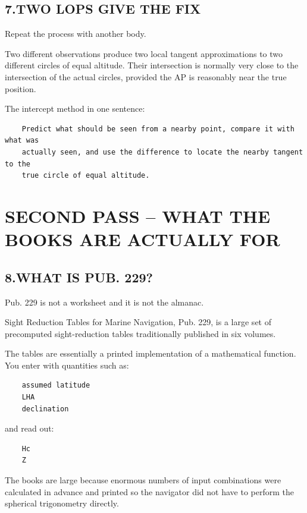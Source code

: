 \documentclass[11pt]{article}
\begin{document}
\subsection*{7.\quad TWO LOPS GIVE THE FIX}

Repeat the process with another body.

Two different observations produce two local tangent approximations to two different circles of equal altitude. Their intersection is normally very close to the intersection of the actual circles, provided the AP is reasonably near the true position.

The intercept method in one sentence:

\begin{verbatim}
    Predict what should be seen from a nearby point, compare it with what was
    actually seen, and use the difference to locate the nearby tangent to the
    true circle of equal altitude.
\end{verbatim}

\section*{SECOND PASS -- WHAT THE BOOKS ARE ACTUALLY FOR}

\subsection*{8.\quad WHAT IS PUB. 229?}

Pub. 229 is not a worksheet and it is not the almanac.

Sight Reduction Tables for Marine Navigation, Pub. 229, is a large set of precomputed sight-reduction tables traditionally published in six volumes.

The tables are essentially a printed implementation of a mathematical function. You enter with quantities such as:

\begin{verbatim}
    assumed latitude
    LHA
    declination
\end{verbatim}

and read out:

\begin{verbatim}
    Hc
    Z
\end{verbatim}

The books are large because enormous numbers of input combinations were calculated in advance and printed so the navigator did not have to perform the spherical trigonometry directly.
\end{document}
